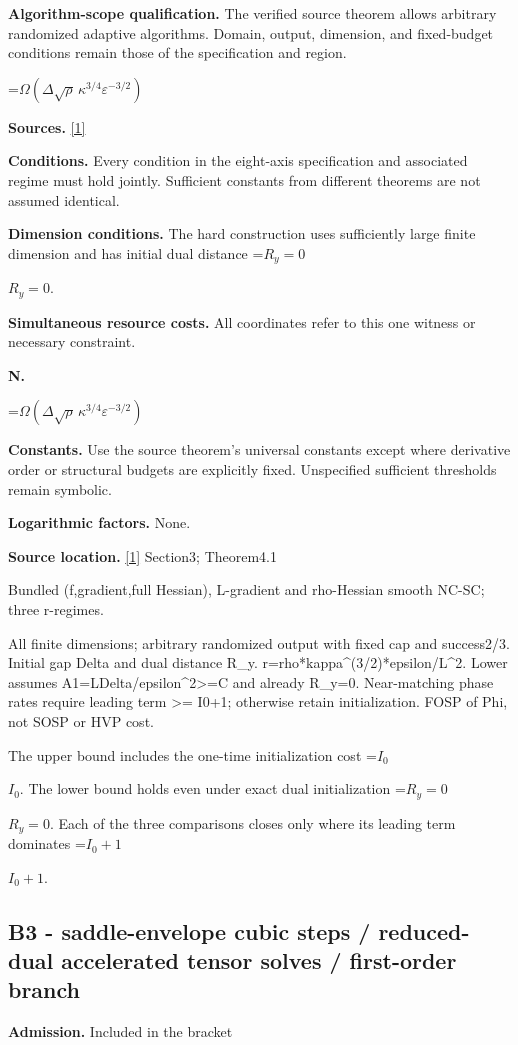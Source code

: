 \documentclass[10pt,a4paper]{article}
\newcommand{\AtlasMath}[1]{\par\begingroup\centering\setbox0=\hbox{$\displaystyle #1$}\ifdim\wd0>1.4\linewidth\typeout{ATLAS WIDE FORMULA: \the\wd0}\fi\ifdim\wd0>\linewidth\resizebox{\linewidth}{!}{\box0}\else\box0\fi\par\endgroup}
\newcommand{\AtlasInlineMath}[1]{\begingroup\setbox0=\hbox{$#1$}\ifdim\wd0>.4\linewidth\endgroup\AtlasMath{#1}\else\endgroup$#1$\fi}
\begin{document}
\textbf{Algorithm-scope qualification.} The verified source theorem allows arbitrary randomized adaptive algorithms. Domain, output, dimension, and fixed-budget conditions remain those of the specification and region.

\AtlasMath{\Omega(\Delta\sqrt\rho\,\kappa^{3/4}\varepsilon^{-3/2})}
\textbf{Sources.} \href{https://arxiv.org/pdf/2610.16771v2}{[1]}

\textbf{Conditions.} Every condition in the eight-axis specification and associated regime must hold jointly. Sufficient constants from different theorems are not assumed identical.

\textbf{Dimension conditions.} The hard construction uses sufficiently large finite dimension and has initial dual distance \AtlasInlineMath{R_y=0}.

\textbf{Simultaneous resource costs.} All coordinates refer to this one witness or necessary constraint.

\textbf{N.}

\AtlasMath{\Omega(\Delta\sqrt\rho\,\kappa^{3/4}\varepsilon^{-3/2})}
\textbf{Constants.} Use the source theorem’s universal constants except where derivative order or structural budgets are explicitly fixed. Unspecified sufficient thresholds remain symbolic.

\textbf{Logarithmic factors.} None.

\textbf{Source location.} \href{https://arxiv.org/pdf/2610.16771v2}{[1]} Section3; Theorem4.1

Bundled (f,gradient,full Hessian), L-gradient and rho-Hessian smooth NC-SC; three r-regimes.

All finite dimensions; arbitrary randomized output with fixed cap and success2/3. Initial gap Delta and dual distance R\_y. r=rho*kappa\textasciicircum{}(3/2)*epsilon/L\textasciicircum{}2. Lower assumes A1=LDelta/epsilon\textasciicircum{}2>=C and already R\_y=0. Near-matching phase rates require leading term >= I0+1; otherwise retain initialization. FOSP of Phi, not SOSP or HVP cost.

The upper bound includes the one-time initialization cost \AtlasInlineMath{I_0}. The lower bound holds even under exact dual initialization \AtlasInlineMath{R_y=0}. Each of the three comparisons closes only where its leading term dominates \AtlasInlineMath{I_0+1}.

\subsection{B3 - saddle-envelope cubic steps / reduced-dual accelerated tensor solves / first-order branch}
\textbf{Admission.} Included in the bracket
\end{document}
